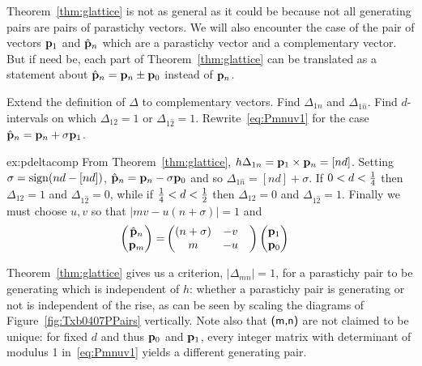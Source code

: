 Theorem~\ref{thm:glattice} is not as general as it could be because not all generating pairs are pairs of parastichy vectors. We will also encounter the case of the pair of vectors 
${\mathbf p}_{1}$ and $\hat{\mathbf p}_{n}$ which are a parastichy vector and a complementary vector. But if need be, each part of Theorem~\ref{thm:glattice} can be translated as a statement about $\hat{\mathbf p}_{n}={\mathbf p}_{n}\pm{\mathbf p}_{0}$ instead of ${\mathbf p}_{n}$. 

\begin{jExercise}\label{ex:pdeltacomp}\label{ex:calcdelta}
Extend the definition of $\Delta$ to complementary vectors. 	Find   $\Delta_{1n}$ and $\Delta_{1\hat n}$. Find  $d$-intervals on which 
$\Delta_{12}=1$ or $\Delta_{1\hat 2}=1$. Rewrite~\eqref{eq:Pmnuv1} for the case $\hat{\mathbf p}_{n}={\mathbf p}_{n}+\sigma{\mathbf p}_{1}$.
\end{jExercise}
\begin{jAnswer}{ex:pdeltacomp}
From Theorem~\ref{thm:glattice}, $h\Delta_{1n}={\mathbf p}_{1}\times{\mathbf p}_{n}=[nd]$.
Setting $\sigma=\mathrm{sign} (nd -[nd])$, $\hat{\mathbf p}_{n}={\mathbf p}_{n}-\sigma{\mathbf p}_{0}$ and so $\Delta_{1\hat n}=[nd]+\sigma$. 
If $0<d<\textstyle{\frac{1}{4}}$ then $\Delta_{12}=1$ and $\Delta_{1\hat2}=0$, while 
if  $\textstyle{\frac{1}{4}}<d<\textstyle{\frac{1}{2}}$ then  $\Delta_{12}=0$ and $\Delta_{1\hat2}=1$.
Finally we must choose $u,v$ so that $|mv -u(n+\sigma)|=1$ and
		\begin{align}\label{eq:Pmnuv1ex}
		\begin{pmatrix}
			\hat{\mathbf p}_{n} \\ {\mathbf p}_{m} 
		\end{pmatrix} = &
		\begin{pmatrix}
			(n+\sigma)  & - v 
			\\
			m &- u &
		\end{pmatrix}
		\begin{pmatrix}
			{\mathbf p}_{1}
			\\
			{\mathbf p}_{0}
		\end{pmatrix}
	\end{align}
\end{jAnswer}

Theorem~\ref{thm:glattice} gives us a criterion, $|\Delta_{mn}|=1$, for a parastichy pair to be generating which is independent of $h$: whether a parastichy pair is generating or not is independent of the rise, as can be seen by scaling the diagrams of Figure~\ref{fig:Txb0407PPairs} vertically.  Note also that $\textsf{(m,n)}$ are not claimed to be unique: for fixed $d$ and thus ${\mathbf p}_{0}$ and ${\mathbf p}_{1}$, every integer matrix with determinant of modulus 1 in~\eqref{eq:Pmnuv1} yields a different generating pair.


